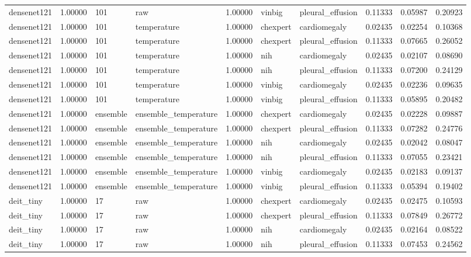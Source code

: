 \begin{tabular}{lrllrllrrr}
densenet121 & 1.00000 & 101 & raw & 1.00000 & vinbig & pleural\_effusion & 0.11333 & 0.05987 & 0.20923 \\
densenet121 & 1.00000 & 101 & temperature & 1.00000 & chexpert & cardiomegaly & 0.02435 & 0.02254 & 0.10368 \\
densenet121 & 1.00000 & 101 & temperature & 1.00000 & chexpert & pleural\_effusion & 0.11333 & 0.07665 & 0.26052 \\
densenet121 & 1.00000 & 101 & temperature & 1.00000 & nih & cardiomegaly & 0.02435 & 0.02107 & 0.08690 \\
densenet121 & 1.00000 & 101 & temperature & 1.00000 & nih & pleural\_effusion & 0.11333 & 0.07200 & 0.24129 \\
densenet121 & 1.00000 & 101 & temperature & 1.00000 & vinbig & cardiomegaly & 0.02435 & 0.02236 & 0.09635 \\
densenet121 & 1.00000 & 101 & temperature & 1.00000 & vinbig & pleural\_effusion & 0.11333 & 0.05895 & 0.20482 \\
densenet121 & 1.00000 & ensemble & ensemble\_temperature & 1.00000 & chexpert & cardiomegaly & 0.02435 & 0.02228 & 0.09887 \\
densenet121 & 1.00000 & ensemble & ensemble\_temperature & 1.00000 & chexpert & pleural\_effusion & 0.11333 & 0.07282 & 0.24776 \\
densenet121 & 1.00000 & ensemble & ensemble\_temperature & 1.00000 & nih & cardiomegaly & 0.02435 & 0.02042 & 0.08047 \\
densenet121 & 1.00000 & ensemble & ensemble\_temperature & 1.00000 & nih & pleural\_effusion & 0.11333 & 0.07055 & 0.23421 \\
densenet121 & 1.00000 & ensemble & ensemble\_temperature & 1.00000 & vinbig & cardiomegaly & 0.02435 & 0.02183 & 0.09137 \\
densenet121 & 1.00000 & ensemble & ensemble\_temperature & 1.00000 & vinbig & pleural\_effusion & 0.11333 & 0.05394 & 0.19402 \\
deit\_tiny & 1.00000 & 17 & raw & 1.00000 & chexpert & cardiomegaly & 0.02435 & 0.02475 & 0.10593 \\
deit\_tiny & 1.00000 & 17 & raw & 1.00000 & chexpert & pleural\_effusion & 0.11333 & 0.07849 & 0.26772 \\
deit\_tiny & 1.00000 & 17 & raw & 1.00000 & nih & cardiomegaly & 0.02435 & 0.02164 & 0.08522 \\
deit\_tiny & 1.00000 & 17 & raw & 1.00000 & nih & pleural\_effusion & 0.11333 & 0.07453 & 0.24562 \\

\end{tabular}
